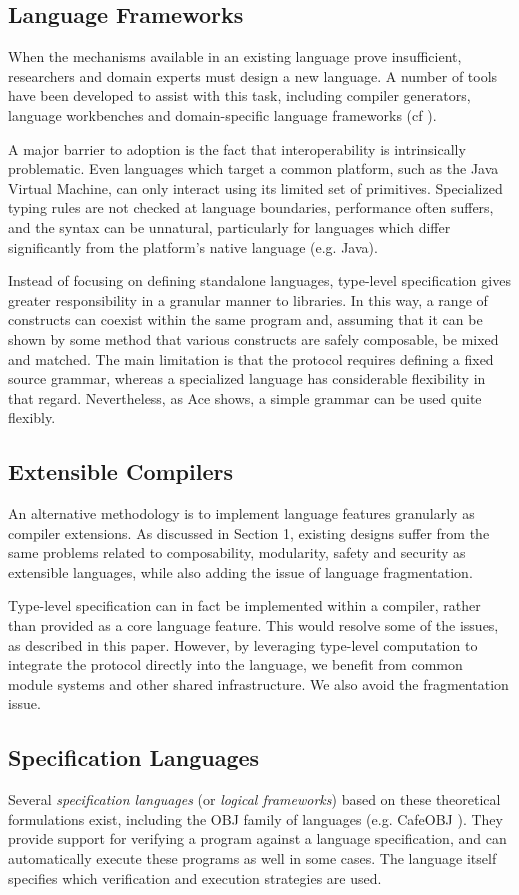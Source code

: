 \documentclass{llncs}
\begin{document}
\subsection{Language Frameworks}
When the mechanisms available in an existing language prove insufficient, researchers and domain experts must design a new language. A number of tools have been developed to assist with this task, including compiler generators, language workbenches and domain-specific language frameworks (cf \cite{fowler2010domain}).

A major barrier to adoption is the fact that interoperability is intrinsically problematic. Even languages which target a common platform, such as the Java Virtual Machine, can only interact using its limited set of primitives. Specialized typing rules are not checked at language boundaries, performance often suffers, and the syntax can be unnatural, particularly for languages which differ significantly from the platform's native language (e.g. Java).

Instead of focusing on defining standalone languages, type-level specification gives greater responsibility in a granular manner to libraries. In this way, a range of constructs can coexist within the same program and, assuming that it can be shown by some method that various constructs are safely composable, be mixed and matched. The main limitation is that the protocol requires defining a fixed source grammar, whereas a specialized language has considerable flexibility in that regard. Nevertheless, as Ace shows, a simple grammar can be used quite flexibly.
\subsection{Extensible Compilers}
An alternative methodology is to implement language features granularly as compiler extensions. As discussed in Section 1, existing designs suffer from the same problems related to composability, modularity\-, safety and security as extensible languages, while also adding the issue of language fragmentation.

Type-level specification can in fact be implemented within a compiler, rather than provided as a core language feature. This would resolve some of the issues, as described in this paper. However, by leveraging type-level computation to integrate the protocol directly into the language, we benefit from common module systems and other shared infrastructure. We also avoid the fragmentation issue.
\subsection{Specification Languages}
Several {\it specification languages} (or {\it logical frameworks}) based on these theoretical formulations exist, including the OBJ family of languages (e.g. CafeOBJ \cite{Diaconescu-Futatsugi01}). They provide support for verifying a program against a language specification, and can automatically execute these programs as well in some cases. The  language itself specifies which verification and execution strategies are used.
\end{document}
